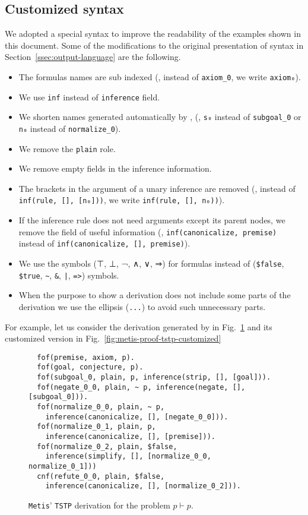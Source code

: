 \documentclass[../main.tex]{subfiles}
\begin{document}
\begin{subappendices}
\section{Customized \TSTP syntax}
\label{app:tstp-syntax}

We adopted a special \TSTP syntax to improve the readability of the \TSTP
examples shown in this document. Some of the modifications to the original
presentation of \TSTP syntax in Section~\ref{ssec:output-language} are the
following.

\begin{itemize}
  \item The formulas names are sub indexed (\eg, instead of \verb!axiom_0!,
  we write \verb!axiom₀!).
  \item We use \verb!inf! instead of \verb!inference! field.
  \item We shorten names generated automatically by \Metis, (\eg,
\verb!s₀! instead of \verb!subgoal_0! or \verb!n₀!
instead of \verb!normalize_0!).
  \item We remove the \verb!plain! role.
  \item We remove empty fields in the inference information.
  \item The brackets in the argument of a unary inference are removed (\eg,
instead of \verb!inf(rule, [], [n₀]))!, we write
\verb!inf(rule, [], n₀))!).
  \item If the inference rule does not need arguments except its parent nodes,
  we remove the field of useful information (\eg,
 \verb!inf(canonicalize, premise)! instead of
 \verb!inf(canonicalize, [], premise)!).
  \item We use the symbols (⊤, ⊥, ¬, ∧, ∨, ⇒) for formulas instead of
  (\verb!$false!, \verb!$true!, \verb!~!, \verb!&!, \verb!|!, \verb!=>!) \TPTP symbols.
  \item When the purpose to show a \TSTP derivation does not include
  some parts of the derivation we use the ellipsis (\verb!...!) to avoid
  such unnecessary parts.
\end{itemize}

For example, let us consider the \TSTP derivation generated by \Metis
in Fig.~\ref{fig:metis-proof-tstp} and its customized version in
Fig.~\ref{fig:metis-proof-tstp-customized}

\begin{figure}[!ht]
\begin{verbatim}
  fof(premise, axiom, p).
  fof(goal, conjecture, p).
  fof(subgoal_0, plain, p, inference(strip, [], [goal])).
  fof(negate_0_0, plain, ~ p, inference(negate, [], [subgoal_0])).
  fof(normalize_0_0, plain, ~ p,
    inference(canonicalize, [], [negate_0_0])).
  fof(normalize_0_1, plain, p,
    inference(canonicalize, [], [premise])).
  fof(normalize_0_2, plain, $false,
    inference(simplify, [], [normalize_0_0, normalize_0_1]))
  cnf(refute_0_0, plain, $false,
    inference(canonicalize, [], [normalize_0_2])).
\end{verbatim}
\caption{\texttt{Metis}' \texttt{TSTP} derivation for the
problem $p\vdash p$.}
\label{fig:metis-proof-tstp}
\end{figure}


\end{subappendices}
\end{document}
